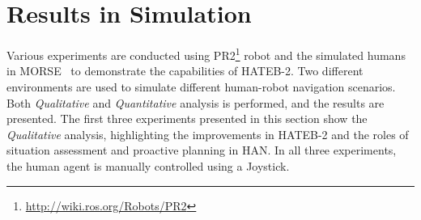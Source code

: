 \section{Results in Simulation}\label{results_chap3}
Various experiments are conducted using PR2\footnote{\url{http://wiki.ros.org/Robots/PR2}} robot and the simulated humans in MORSE~\cite{echeverria2011modular} to demonstrate the capabilities of HATEB-2. Two different environments are used to simulate different human-robot navigation scenarios. Both \textit{Qualitative} and \textit{Quantitative} analysis is performed, and the results are presented. The first three experiments presented in this section show the \textit{Qualitative} analysis, highlighting the improvements in HATEB-2 and the roles of situation assessment and proactive planning in HAN. In all three experiments, the human agent is manually controlled using a Joystick.



